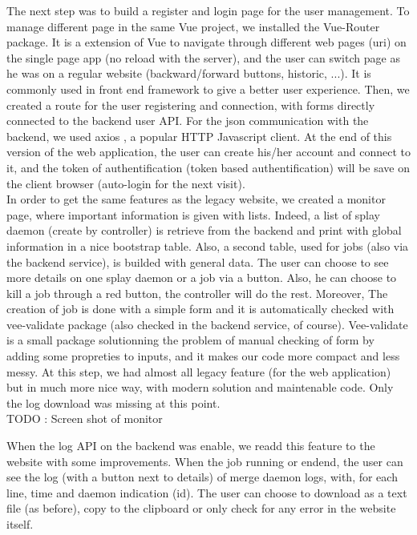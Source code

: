 \documentclass{eplmastersthesis}
\begin{document}
        The next step was to build a register and login page for the user
        management. To manage different page in the same Vue project, we
        installed the Vue-Router package. It is a extension of Vue to navigate
        through different web pages (uri) on the single page app (no reload with
        the server), and the user can switch page as he was on a regular
        website (backward/forward buttons, historic, ...). It is commonly used in
        front end framework to give a better user experience. Then, we created
        a route for the user registering and connection, with forms directly connected to
        the backend user API. For the json communication with the backend, we
        used axios \cite{axios}, a popular HTTP Javascript client. At the end
        of this version of the web application, the user can create his/her
        account and connect to it, and the token of authentification (token
        based authentification) will be save on the client browser (auto-login
        for the next visit). \\

        In order to get the same features as the legacy website, we created a
        monitor page, where important information is given with lists. Indeed,
        a list of splay daemon (create by controller) is retrieve from the
        backend and print with global information in a nice bootstrap table.
        Also, a second table, used for jobs (also via the backend service), is
        builded with general data. The user can choose to see more details on
        one splay daemon or a job via a button. Also, he can choose to kill a
        job through a red button, the controller will do the rest. Moreover, The creation of job is done
        with a simple form and it is automatically checked with vee-validate
        package \cite{VeeValidate} (also checked in the backend service, of
        course). Vee-validate is a small package solutionning the problem of
        manual checking of form by adding some propreties to inputs, and it
        makes our code more compact and less messy. At this step, we had
        almost all legacy feature (for the web application) but in much more
        nice way, with modern solution and maintenable code. Only the log
        download was missing at this point. \\
        {\color{red} TODO : Screen shot of monitor}

        When the log API on the backend was enable, we readd this feature to the website with some
        improvements. When the job running or endend, the user can see the log (with a button next to details)
        of merge daemon logs, with, for each line, time and daemon indication (id). The user can choose to
        download as a text file (as before), copy to the clipboard or only check for any error in
        the website itself.
\end{document}
